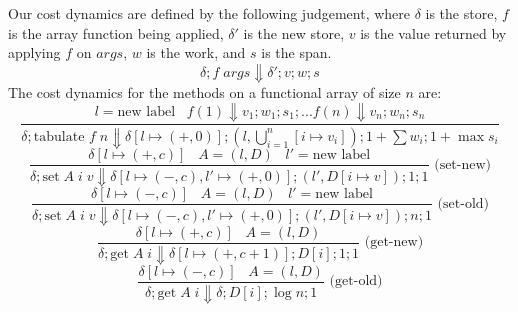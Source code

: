 \documentclass[preprint]{sigplanconf}
\begin{document}
Our cost dynamics are defined by the following judgement, where $\delta$ is the store, $f$ is the array function being applied, $\delta'$ is the new store, $v$ is the value returned by applying $f$ on $args$, $w$ is the work, and $s$ is the span.
$$\delta; f \; args \Downarrow \delta'; v; w; s$$
The cost dynamics for the methods on a functional array of size $n$ are:
$$\frac{l = \text{new label} \;\;\; f(1) \Downarrow v_1; w_1; s_1; ... f(n) \Downarrow v_{n}; w_{n}; s_{n}}{\delta; \text{tabulate } f \; n \Downarrow \delta[l \mapsto (+, 0)]; (l, \bigcup_{i=1}^n [i \mapsto v_i]); 1+\sum w_i; 1+\max s_i}$$
$$\frac{\delta[l \mapsto (+, c)] \;\;\; A = (l,D) \;\;\; l' = \text{new label}}{\delta; \text{set} \; A \; i \; v \Downarrow \delta[l \mapsto (-, c), l' \mapsto (+, 0)]; (l', D[i \mapsto v]); 1; 1} \text{  (set-new)}$$
$$\frac{\delta[l \mapsto (-, c)] \;\;\; A = (l,D) \;\;\;  l' = \text{new label}}{\delta; \text{set} \; A \; i \; v \Downarrow \delta[l \mapsto (-, c), l' \mapsto (+, 0)]; (l', D[i \mapsto v]); n; 1} \text{  (set-old)}$$
$$\frac{\delta[l \mapsto (+, c)] \;\;\; A = (l,D)}{\delta; \text{get} \; A \; i \Downarrow \delta[l \mapsto (+, c+1)]; D[i]; 1; 1} \text{  (get-new)}$$
$$\frac{\delta[l \mapsto (-, c)] \;\;\; A = (l,D)}{\delta; \text{get} \; A \; i \Downarrow \delta; D[i]; \log{n}; 1} \text{  (get-old)}$$
\end{document}

